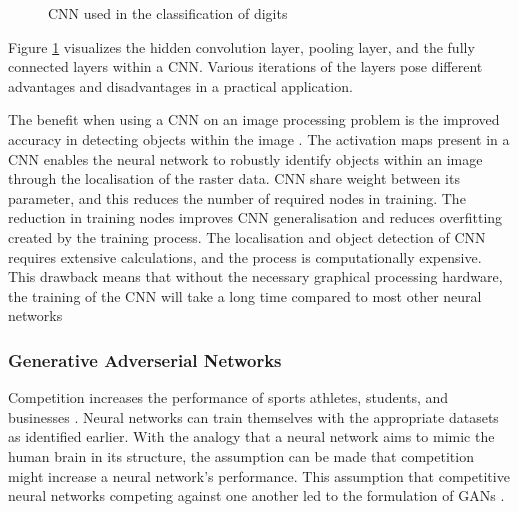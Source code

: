 \begin{figure}[H]%
\centering
{}%
\caption{CNN used in the classification of digits \cite{OShea2015}}%
\label{fig:5}%
\end{figure}

Figure \ref{fig:5} visualizes the hidden convolution layer, pooling layer, and the fully connected layers within a CNN. Various iterations of the layers pose different advantages and disadvantages in a practical application.

The benefit when using a CNN on an image processing problem is the improved accuracy in detecting objects within the image \citep{Albawi, Alzubaidi2021}. The activation maps present in a CNN enables the neural network to robustly identify objects within an image through the localisation of the raster data. CNN share weight between its parameter, and this reduces the number of required nodes in training. The reduction in training nodes improves CNN generalisation and reduces overfitting created by the training process. The localisation and object detection of CNN requires extensive calculations, and the process is computationally expensive. This drawback means that without the necessary graphical processing hardware, the training of the CNN will take a long time compared to most other neural networks \citep{Alzubaidi2021}

\subsubsection{Generative Adverserial Networks}

Competition increases the performance of sports athletes, students, and businesses \citep{Burguillo2010,Hays2009,Medvedev2005}. Neural networks can train themselves with the appropriate datasets as identified earlier. With the analogy that a neural network aims to mimic the human brain in its structure, the assumption can be made that competition might increase a neural network's performance. This assumption that competitive neural networks competing against one another led to the formulation of GANs \citep{Creswell2018}.

